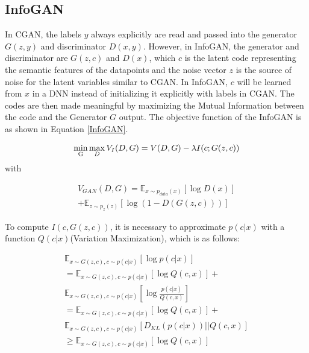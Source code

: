 \documentclass[conference]{IEEEtran}
\begin{document}
\subsection{InfoGAN}
{\color{purple}In CGAN, the labels $y$ always explicitly are read and passed into the generator $G(z,y)$ and discriminator $D(x,y)$. However, in InfoGAN, the generator and discriminator are $G(z,c)$ and $D(x)$, which $c$ is the latent code representing the semantic features of the datapoints and the noise vector $z$ is the source of noise for the latent variables similar to CGAN. In InfoGAN, $c$ will be learned from $x$ in a DNN instead of initializing it explicitly with labels in CGAN. The codes are then made meaningful by maximizing the Mutual Information between the code and the Generator $G$ output. The objective function of the InfoGAN is as shown in Equation \eqref{InfoGAN}.  }

\begin{equation}
\begin{split}
\label{InfoGAN}
\mathop {\min }\limits_{\rm{G}} \mathop {\max }\limits_D V_I(D,G) = V(D,G)-\lambda I(c;G(z,c))
\end{split}
\end{equation}
with

\begin{equation}
\begin{split}
\label{V_InfoGAN}
V_{GAN}(D,G) = \mathbb{E}_{x\sim{p_{data}}(x)}[\log D(x)] \\
+ {\mathbb{E}_{z\sim{p_z}(z)}}[\log (1 - D(G(z,c)))]
\end{split}
\end{equation}

{\color{purple}To compute $I(c,G(z,c))$, it is necessary to approximate $p(c|x)$ with a function $Q(c|x)$(Variation Maximization), which is as follows:}

\begin{equation}
\begin{split}
\label{Variation_Maximization}
\mathbb{E}_{x\sim{G(z,c)},c\sim{p(c|x)}}[\log p(c|x)] \\
= \mathbb{E}_{x\sim{G(z,c)},c\sim{p(c|x)}}[\log Q(c,x)] + \\ \mathbb{E}_{x\sim{G(z,c)},c\sim{p(c|x)}}[\log \frac{p(c|x)}{Q(c,x)}] \\
=  \mathbb{E}_{x\sim{G(z,c)},c\sim{p(c|x)}}[\log Q(c,x)] + \\
\mathbb{E}_{x\sim{G(z,c)},c\sim{p(c|x)}}[{D_{KL}(p(c|x))}||{Q(c,x)}]\\
\geq  \mathbb{E}_{x\sim{G(z,c)},c\sim{p(c|x)}}[\log Q(c,x)] 
\end{split}
\end{equation}



\renewcommand\refname{Reference}


\end{document}
